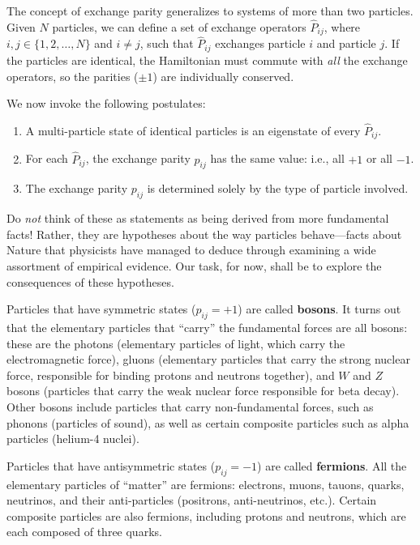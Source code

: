\documentclass[pra,12pt]{revtex4}
\begin{document}
The concept of exchange parity generalizes to systems of more than two
particles.  Given $N$ particles, we can define a set of exchange
operators $\hat{P}_{ij}$, where $i,j\in\{1,2,\dots,N\}$ and $i\ne j$,
such that $\hat{P}_{ij}$ exchanges particle $i$ and particle $j$.  If
the particles are identical, the Hamiltonian must commute with
\textit{all} the exchange operators, so the parities ($\pm 1$) are
individually conserved.

We now invoke the following postulates:
\begin{enumerate}
\item A multi-particle state of identical particles is an eigenstate
  of every $\hat{P}_{ij}$.

\item For each $\hat{P}_{ij}$, the exchange parity $p_{ij}$ has the
  same value: i.e., all $+1$ or all $-1$.

\item The exchange parity $p_{ij}$ is determined solely by the type of
  particle involved.
\end{enumerate}
Do \textit{not} think of these as statements as being derived from
more fundamental facts!  Rather, they are hypotheses about the way
particles behave---facts about Nature that physicists have managed to
deduce through examining a wide assortment of empirical evidence.  Our
task, for now, shall be to explore the consequences of these
hypotheses.

Particles that have symmetric states ($p_{ij} = +1$) are called
\textbf{bosons}.  It turns out that the elementary particles that
``carry'' the fundamental forces are all bosons: these are the photons
(elementary particles of light, which carry the electromagnetic
force), gluons (elementary particles that carry the strong nuclear
force, responsible for binding protons and neutrons together), and $W$
and $Z$ bosons (particles that carry the weak nuclear force
responsible for beta decay).  Other bosons include particles that
carry non-fundamental forces, such as phonons (particles of sound), as
well as certain composite particles such as alpha particles (helium-4
nuclei).

Particles that have antisymmetric states ($p_{ij} = -1$) are called
\textbf{fermions}.  All the elementary particles of ``matter'' are
fermions: electrons, muons, tauons, quarks, neutrinos, and their
anti-particles (positrons, anti-neutrinos, etc.).  Certain composite
particles are also fermions, including protons and neutrons, which are
each composed of three quarks.
\end{document}
